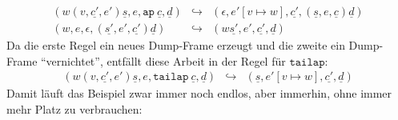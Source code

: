 %
\begin{eqnarray*}
   (w (v,\underline{c'}, e') \underline{s}, e, \mathtt{ap}~\underline{c}, \underline{d})
  &\hookrightarrow&
  (\epsilon, e'[v\mapsto w], \underline{c'}, (\underline{s}, e, \underline{c}) \underline{d})
  \\
  (w, e, \epsilon, (\underline{s'}, e', \underline{c'}) \underline{d})
  &\hookrightarrow&
  (w\underline{s'}, e', \underline{c'}, \underline{d})
\end{eqnarray*}
%
Da die erste Regel ein neues Dump-Frame erzeugt und die zweite ein
Dump-Frame "`vernichtet"', entfällt diese Arbeit in der Regel für
$\mathtt{tailap}$:
%
\begin{eqnarray*}
  (w (v,\underline{c'}, e') \underline{s}, e, \mathtt{tailap}~\underline{c}, \underline{d})
  &\hookrightarrow&
  (\underline{s}, e'[v \mapsto w], \underline{c'}, \underline{d})
\end{eqnarray*}
%
Damit läuft das Beispiel zwar immer noch endlos, aber immerhin, ohne
immer mehr Platz zu verbrauchen:
%
